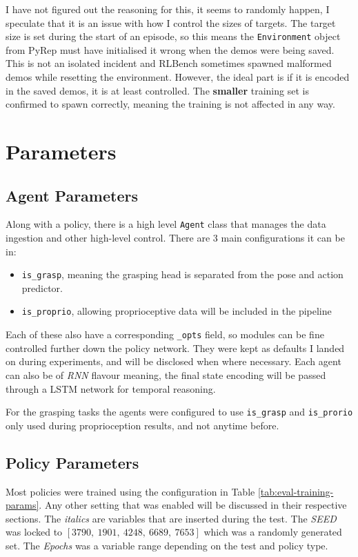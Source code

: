 I have not figured out the reasoning for this, it seems to randomly happen, I speculate that it is an issue with how I control the sizes of targets. The target size is set during the start of an episode, so this means the \verb|Environment| object from PyRep must have initialised it wrong when the demos were being saved. This is not an isolated incident and RLBench sometimes spawned malformed demos while resetting the environment. However, the ideal part is if it is encoded in the saved demos, it is at least controlled. The \textbf{smaller} training set is confirmed to spawn correctly, meaning the training is not affected in any way.

\section{Parameters}

\subsection{Agent Parameters}
Along with a policy, there is a high level \verb|Agent| class that manages the data ingestion and other high-level control. There are 3 main configurations it can be in:
\begin{itemize}
  \item \verb|is_grasp|, meaning the grasping head is separated from the pose and action predictor.
  \item \verb|is_proprio|, allowing proprioceptive data will be included in the pipeline
\end{itemize}
Each of these also have a corresponding \verb|_opts| field, so modules can be fine controlled further down the policy network. They were kept as defaults I landed on during experiments, and will be disclosed when where necessary. Each agent can also be of \emph{RNN} flavour meaning, the final state encoding will be passed through a LSTM network for temporal reasoning.

For the grasping tasks the agents were configured to use \verb|is_grasp| and \verb|is_prorio| only used during proprioception results, and not anytime before.

\subsection{Policy Parameters}
Most policies were trained using the configuration in Table \ref{tab:eval-training-params}. Any other setting that was enabled will be discussed in their respective sections. The \emph{italics} are variables that are inserted during  the test. The \emph{SEED} was locked to \( \left[ 3790, ~1901, ~4248, ~6689, ~7653 \right] \) which was a randomly generated set. The \emph{Epochs} was a variable range depending on the test and policy type.

